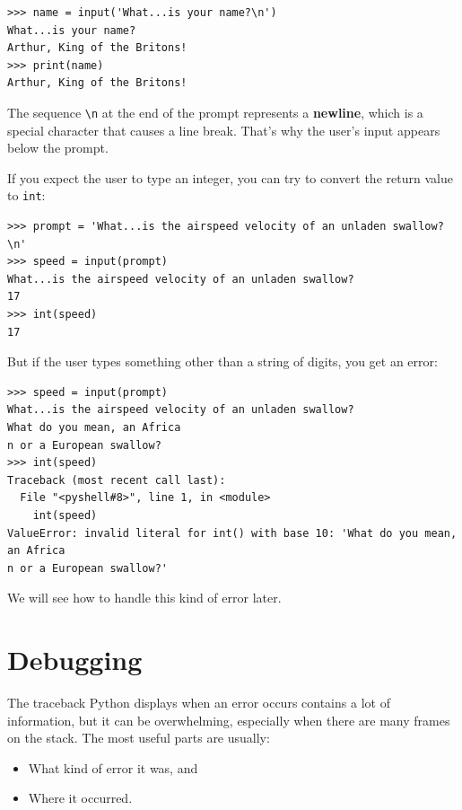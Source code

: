 \documentclass[10pt]{book}
\begin{document}

\beforeverb
\begin{verbatim}
>>> name = input('What...is your name?\n')
What...is your name?
Arthur, King of the Britons!
>>> print(name)
Arthur, King of the Britons!
\end{verbatim}
\afterverb
%
The sequence \verb"\n" at the end of the prompt represents a {\bf newline},
which is a special character that causes a line break.
That's why the user's input appears below the prompt.


If you expect the user to type an integer, you can try to convert
the return value to {\tt int}:

\beforeverb
\begin{verbatim}
>>> prompt = 'What...is the airspeed velocity of an unladen swallow?\n'
>>> speed = input(prompt)
What...is the airspeed velocity of an unladen swallow?
17
>>> int(speed)
17
\end{verbatim}
\afterverb
%
But if the user types something other than a string of digits,
you get an error:

\beforeverb
\begin{verbatim}
>>> speed = input(prompt)
What...is the airspeed velocity of an unladen swallow?
What do you mean, an Africa
n or a European swallow?
>>> int(speed)
Traceback (most recent call last):
  File "<pyshell#8>", line 1, in <module>
    int(speed)
ValueError: invalid literal for int() with base 10: 'What do you mean, an Africa
n or a European swallow?'
\end{verbatim}
\afterverb
%
We will see how to handle this kind of error later.



\section{Debugging}
\label{whitespace}

The traceback Python displays when an error occurs contains
a lot of information, but it can be overwhelming, especially
when there are many frames on the stack.  The most
useful parts are usually:

\begin{itemize}

\item What kind of error it was, and

\item Where it occurred.

\end{itemize}
\end{document}
